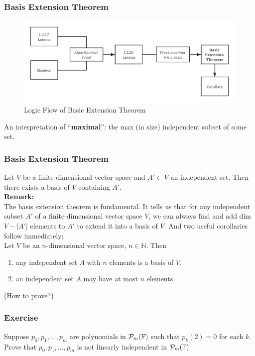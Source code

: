 \documentclass[12pt, t]{beamer}
\newcommand{\N}{\mathbb{N}}
\newcommand{\nullspace}{~\\[15pt]}
\newcommand{\remark}{\textbf{Remark: }}
\begin{document}
\begin{frame}
    \frametitle{Basis Extension Theorem}
    \begin{figure}[H]
        \centering
        \includegraphics[width=\textwidth]{chart1.png}
        \caption{Logic Flow of Basic Extension Theorem}
        \label{fig:bet}
    \end{figure}
    An interpretation of ``\textbf{maximal}'': the max (in size) independent subset of some set.
\end{frame}

\begin{frame}
    \frametitle{Basis Extension Theorem}
    Let $V$ be a finite-dimensional vector space and $A'\subset V$ an independent set. Then there exists a basis of $V$ containing $A'$.
    \nullspace
    \remark\\
    The basis extension theorem is fundamental. It tells us that for any independent subset $A'$ of a finite-dimensional vector space $V$, we can always find and add dim $V-|A'|$ elements to $A'$ to extend it into a basis of $V$. And two useful corollaries follow immediately:\nullspace
    Let $V$ be an $n$-dimensional vector space, $n\in\N$. Then\\
    \begin{enumerate}
        \item any independent set $A$ with $n$ elements is a basis of $V$.
        \item an independent set $A$ may have at most $n$ elements.
    \end{enumerate}
    (How to prove?)
\end{frame}

\begin{frame}
    \frametitle{Exercise}
    Suppose $p_{0}, p_{1}, \ldots, p_{m}$ are polynomials in $\mathcal{P}_{m}(\mathbb{F})$ such that $p_{k}(2)=0$ for each $k.$ Prove that $p_{0}, p_{1}, \ldots, p_{m}$ is not linearly independent in $\mathcal{P}_{m}(\mathbb{F})$
    

\end{frame}
\end{document}
